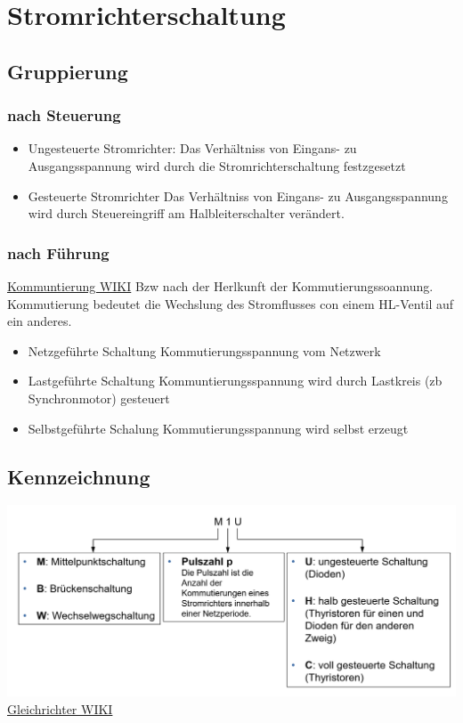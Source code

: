 \section{Stromrichterschaltung}
\subsection{Gruppierung}
\subsubsection{nach Steuerung}
\begin{itemize}
    \item Ungesteuerte Stromrichter:
        \subitem Das Verhältniss von Eingans- zu Ausgangsspannung wird durch die Stromrichterschaltung festzgesetzt
    \item Gesteuerte Stromrichter
        \subitem Das Verhältniss von Eingans- zu Ausgangsspannung wird durch Steuereingriff am Halbleiterschalter verändert. 
\end{itemize}

\subsubsection{nach Führung}

\href{https://de.wikipedia.org/wiki/Kommutierung}{Kommuntierung WIKI}\newline
Bzw nach der Herlkunft der Kommutierungssoannung.\newline
Kommutierung bedeutet die Wechslung des Stromflusses con einem HL-Ventil auf ein anderes.
\begin{itemize}
    \item Netzgeführte Schaltung
        \subitem Kommutierungsspannung vom Netzwerk
    \item Lastgeführte Schaltung
        \subitem Kommuntierungsspannung wird durch Lastkreis (zb Synchronmotor) gesteuert
    \item Selbstgeführte Schalung
        \subitem Kommutierungsspannung wird selbst erzeugt
\end{itemize}

\subsection{Kennzeichnung}
\includegraphics[width=0.8\linewidth]{images/SRKennzeichnung}\newline
\href{https://de.wikipedia.org/wiki/Gleichrichter}{Gleichrichter WIKI}

